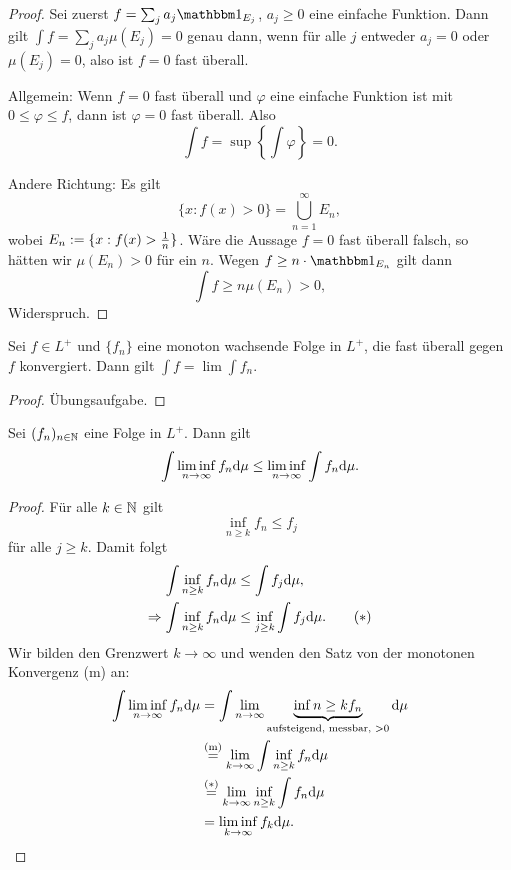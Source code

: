 \begin{proof}
 Sei zuerst $f = \sum_j a_j \ind_{E_j}$, $a_j \ge 0$ eine einfache Funktion. Dann gilt $\int f = \sum_j a_j \mu( E_j ) = 0$ genau dann, wenn für alle $j$ entweder $a_j = 0$ oder $\mu( E_j ) = 0$, also ist $f = 0$ fast überall.
 
 Allgemein: Wenn $f=0$ fast überall und $\varphi$ eine einfache Funktion ist mit $0 \le \varphi \le f$, dann ist $\varphi = 0$ fast überall. Also
 \[ \int f = \sup \left\{ \int \varphi \right\} = 0. \]
 
 Andere Richtung: Es gilt
 \[ \{ x : f(x) > 0 \} = \bigcup_{n=1}^\infty E_n, \]
 wobei $E_n := \{ x : f(x) > \frac{1}{n} \}$. Wäre die Aussage $f=0$ fast überall falsch, so hätten wir $\mu(E_n) > 0$ für ein $n$. Wegen $f \ge n \cdot \ind_{E_n}$ gilt dann 
 \[ \int f \ge n \mu( E_n ) > 0, \]
 Widerspruch.
\end{proof}

\begin{folg}
 Sei $f \in L^+$ und $\{ f_n\}$ eine monoton wachsende Folge in $L^+$, die fast überall gegen $f$ konvergiert. Dann gilt $\int f = \lim \int f_n.$
\end{folg}

\begin{proof}
 Übungsaufgabe.
\end{proof}

\begin{thm}
 Sei $(f_n)_{n \in \mathbb{N}}$ eine Folge in $L^+$. Dann gilt
 \[ \int \liminf_{n \to \infty} f_n \mathrm{d} \mu \le \liminf_{n \to \infty} \int f_n \mathrm{d} \mu. \]
\end{thm}

\begin{proof}
 Für alle $k \in \mathbb{N}$ gilt
 \[ \inf_{n \ge k} f_n \le f_j \]
 für alle $j \ge k$. Damit folgt 
 \begin{align*}
     \int \inf_{n \ge k} f_n \mathrm{d} \mu &\le \int f_j \mathrm{d} \mu, \\
     \Rightarrow \int \inf_{n \ge k} f_n \mathrm{d} \mu &\le \inf_{j \ge k} \int f_j \mathrm{d} \mu. \tag{$*$}
 \end{align*}
 Wir bilden den Grenzwert $k \to \infty$ und wenden den Satz von der monotonen Konvergenz (m) an:
 \begin{align*}
     \int \liminf_{n \to \infty} f_n \mathrm{d} \mu &= \int \lim_{n \to \infty} \underbrace{\inf{n \ge k} f_n}_{\text{aufsteigend, messbar, } > 0} \mathrm{d} \mu \\
     &\overset{(\text{m})}{=} \lim_{k \to \infty} \int \inf_{n \ge k} f_n \mathrm{d} \mu \\
     &\overset{(*)}{=} \lim_{k \to \infty} \inf_{n \ge k} \int f_n \mathrm{d} \mu \\
     &= \liminf_{k \to \infty} f_k \mathrm{d} \mu. \qedhere
 \end{align*}
\end{proof}

